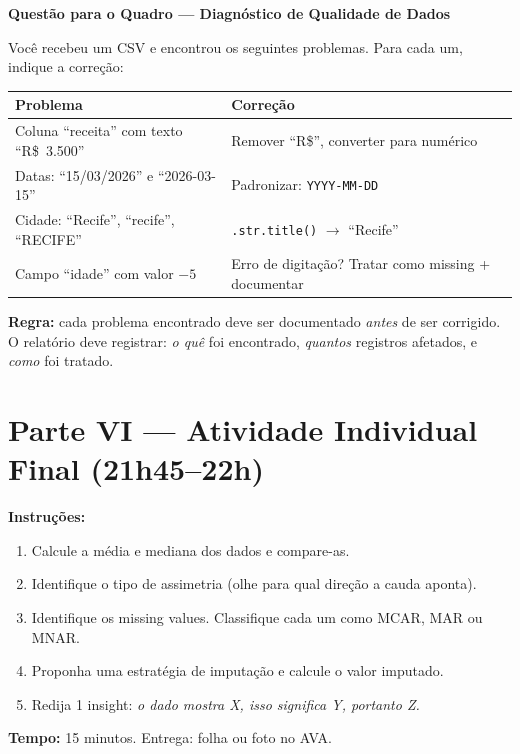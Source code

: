 \begin{SolvedBox}
\textbf{Questão para o Quadro — Diagnóstico de Qualidade de Dados}

Você recebeu um CSV e encontrou os seguintes problemas. Para cada um,
indique a correção:

\begin{center}
\begin{tabular}{|p{5.5cm}|p{7cm}|}
\hline
\textbf{Problema} & \textbf{Correção} \\
\hline
Coluna ``receita'' com texto ``R\$~3.500'' & Remover ``R\$'', converter para numérico \\
\hline
Datas: ``15/03/2026'' e ``2026-03-15'' & Padronizar: \texttt{YYYY-MM-DD} \\
\hline
Cidade: ``Recife'', ``recife'', ``RECIFE'' & \texttt{.str.title()} $\to$ ``Recife'' \\
\hline
Campo ``idade'' com valor $-5$ & Erro de digitação? Tratar como missing + documentar \\
\hline
\end{tabular}
\end{center}

\textbf{Regra:} cada problema encontrado deve ser documentado \emph{antes}
de ser corrigido. O relatório deve registrar: \textit{o quê} foi
encontrado, \textit{quantos} registros afetados, e \textit{como} foi tratado.
\end{SolvedBox}

\section{Parte VI — Atividade Individual Final (21h45–22h)}

\begin{SolvedBox}
\textbf{Instruções:}
\begin{enumerate}
  \item Calcule a média e mediana dos dados e compare-as.
  \item Identifique o tipo de assimetria (olhe para qual direção a cauda aponta).
  \item Identifique os missing values. Classifique cada um como MCAR, MAR ou MNAR.
  \item Proponha uma estratégia de imputação e calcule o valor imputado.
  \item Redija 1 insight: \emph{o dado mostra X, isso significa Y, portanto Z.}
\end{enumerate}
\textbf{Tempo:} 15 minutos. Entrega: folha ou foto no AVA.
\end{SolvedBox}

